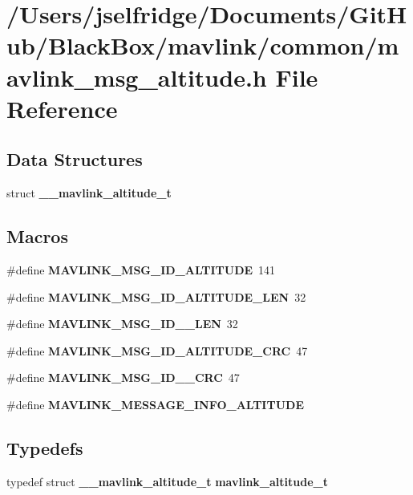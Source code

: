 \section{/\+Users/jselfridge/\+Documents/\+Git\+Hub/\+Black\+Box/mavlink/common/mavlink\+\_\+msg\+\_\+altitude.h File Reference}
\label{mavlink__msg__altitude_8h}
\subsection*{Data Structures}
\begin{DoxyCompactItemize}
\item 
struct \textbf{ \+\_\+\+\_\+mavlink\+\_\+altitude\+\_\+t}
\end{DoxyCompactItemize}
\subsection*{Macros}
\begin{DoxyCompactItemize}
\item 
\#define \textbf{ M\+A\+V\+L\+I\+N\+K\+\_\+\+M\+S\+G\+\_\+\+I\+D\+\_\+\+A\+L\+T\+I\+T\+U\+DE}~141
\item 
\#define \textbf{ M\+A\+V\+L\+I\+N\+K\+\_\+\+M\+S\+G\+\_\+\+I\+D\+\_\+\+A\+L\+T\+I\+T\+U\+D\+E\+\_\+\+L\+EN}~32
\item 
\#define \textbf{ M\+A\+V\+L\+I\+N\+K\+\_\+\+M\+S\+G\+\_\+\+I\+D\+\_\+\_\+\+L\+EN}~32
\item 
\#define \textbf{ M\+A\+V\+L\+I\+N\+K\+\_\+\+M\+S\+G\+\_\+\+I\+D\+\_\+\+A\+L\+T\+I\+T\+U\+D\+E\+\_\+\+C\+RC}~47
\item 
\#define \textbf{ M\+A\+V\+L\+I\+N\+K\+\_\+\+M\+S\+G\+\_\+\+I\+D\+\_\+\_\+\+C\+RC}~47
\item 
\#define \textbf{ M\+A\+V\+L\+I\+N\+K\+\_\+\+M\+E\+S\+S\+A\+G\+E\+\_\+\+I\+N\+F\+O\+\_\+\+A\+L\+T\+I\+T\+U\+DE}
\end{DoxyCompactItemize}
\subsection*{Typedefs}
\begin{DoxyCompactItemize}
\item 
typedef struct \textbf{ \+\_\+\+\_\+mavlink\+\_\+altitude\+\_\+t} \textbf{ mavlink\+\_\+altitude\+\_\+t}
\end{DoxyCompactItemize}


